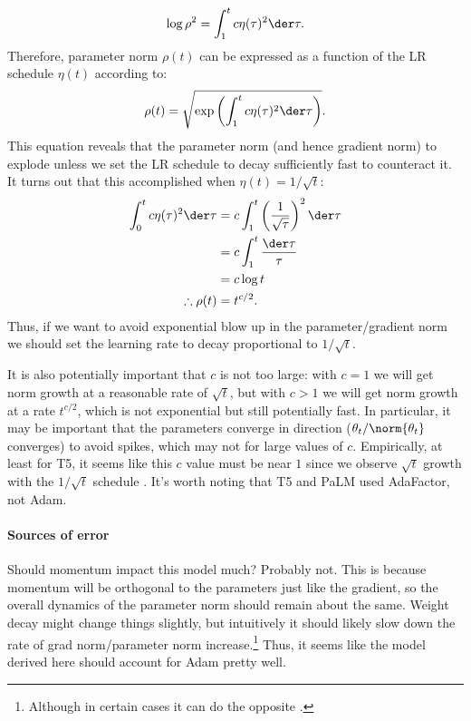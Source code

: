 \begin{equation*}
    \log \rho^2 = \int_1^t c \eta(\tau)^2 \der \tau .
\end{equation*}
Therefore, parameter norm $\rho(t)$ can be expressed as a function of the LR schedule $\eta(t)$ according to:
\begin{equation*}
    \rho(t) = \sqrt{\exp \left( \int_1^t c \eta(\tau)^2 \der \tau \right)} .
\end{equation*}
This equation reveals that the parameter norm (and hence gradient norm) to explode unless we set the LR schedule to decay sufficiently fast to counteract it. It turns out that this accomplished when $\eta(t) = 1/\sqrt{t}$:
\begin{align*}
    \int_0^t c \eta(\tau)^2 \der \tau
    &= c \int_1^t \left(\frac{1}{\sqrt{\tau}}\right)^2 \der \tau \\
    &= c \int_1^t \frac{\der \tau}{\tau} \\
    &= c \log t \\
    \therefore \rho(t) &= t^{c/2} .
\end{align*}
Thus, if we want to avoid exponential blow up in the parameter/gradient norm we should set the learning rate to decay proportional to $1/\sqrt{t}$.

It is also potentially important that $c$ is not too large: with $c = 1$ we will get norm growth at a reasonable rate of $\sqrt{t}$, but with $c > 1$ we will get norm growth at a rate $t^{c/2}$, which is not exponential but still potentially fast. In particular, it may be important that the parameters converge in direction ($\theta_t/\norm{\theta_t}$ converges) to avoid spikes, which may not for large values of $c$. Empirically, at least for T5, it seems like this $c$ value must be near $1$ since we observe $\sqrt{t}$ growth with the $1/\sqrt{t}$ schedule \citep{merrill2021effects}. It's worth noting that T5 and PaLM used AdaFactor, not Adam.

\paragraph{Sources of error} Should momentum impact this model much? Probably not. This is because momentum will be orthogonal to the parameters just like the gradient, so the overall dynamics of the parameter norm should remain about the same. Weight decay might change things slightly, but intuitively it should likely slow down the rate of grad norm/parameter norm increase.\footnote{Although in certain cases it can do the opposite \citep{li2019exponential}.} Thus, it seems like the model derived here should account for Adam pretty well.

